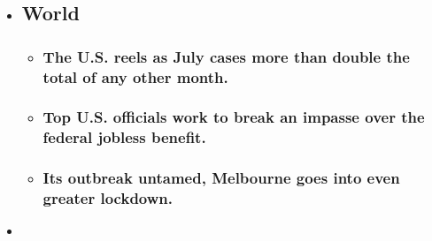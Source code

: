 \begin{itemize}
\item
  \href{https://www.nytimes.com/2020/08/01/world/coronavirus-covid-19.html?type=styln-live-updates\&label=world\&index=0}{}

  \hypertarget{world}{%
  \subsection{World}\label{world}}

  \begin{itemize}
  \item
    \href{https://www.nytimes.com/2020/08/01/world/coronavirus-covid-19.html?type=styln-live-updates\&label=world\&index=0\#link-34047410}{}

    \hypertarget{the-us-reels-as-july-cases-more-than-double-the-total-of-any-other-month}{%
    \subsubsection{The U.S. reels as July cases more than double the
    total of any other
    month.}\label{the-us-reels-as-july-cases-more-than-double-the-total-of-any-other-month}}
  \item
    \href{https://www.nytimes.com/2020/08/01/world/coronavirus-covid-19.html?type=styln-live-updates\&label=world\&index=0\#link-780ec966}{}

    \hypertarget{top-us-officials-work-to-break-an-impasse-over-the-federal-jobless-benefit}{%
    \subsubsection{Top U.S. officials work to break an impasse over the
    federal jobless
    benefit.}\label{top-us-officials-work-to-break-an-impasse-over-the-federal-jobless-benefit}}
  \item
    \href{https://www.nytimes.com/2020/08/01/world/coronavirus-covid-19.html?type=styln-live-updates\&label=world\&index=0\#link-2bc8948}{}

    \hypertarget{its-outbreak-untamed-melbourne-goes-into-even-greater-lockdown}{%
    \subsubsection{Its outbreak untamed, Melbourne goes into even
    greater
    lockdown.}\label{its-outbreak-untamed-melbourne-goes-into-even-greater-lockdown}}
  \end{itemize}
\item
  \href{https://www.nytimes.com/live/2020/07/31/business/stock-market-today-coronavirus?type=styln-live-updates\&label=business\&index=1}{}


\end{itemize}
